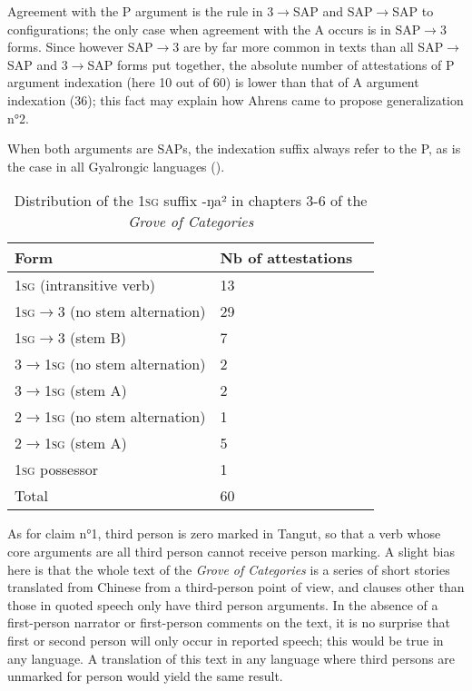 \documentclass[oldfontcommands,oneside,a4paper,11pt]{article}
\newcommand{\ipa}[1]{{\phon \mbox{#1}}} %
\begin{document}
Agreement with the P argument is the rule in 3$\rightarrow$SAP and SAP$\rightarrow$SAP to configurations; the only case when agreement with the A occurs is in SAP$\rightarrow$3 forms. Since however SAP$\rightarrow$3 are by far more common in texts than all SAP$\rightarrow$SAP and 3$\rightarrow$SAP forms put together, the absolute number of attestations of P argument indexation (here 10 out of 60) is lower than that of A argument indexation (36); this fact may explain how Ahrens came to propose generalization n°2.

When both arguments are SAPs, the indexation suffix always refer to the P, as is the case in all Gyalrongic languages (\citealt{jackson03caodeng, jacques10inverse, gongxun14agreement, lai15person}). 

\begin{table}[H]
\caption{Distribution of the \textsc{1sg} suffix \ipa{-ŋa²} in chapters 3-6 of the \textit{Grove of Categories}} \label{tab:1sg} \centering
\begin{tabular}{lll}
\toprule
Form& Nb of attestations \\
\midrule
\textsc{1sg} (intransitive verb) & 	13 \\ 
\textsc{1sg}$\rightarrow$3  (no stem alternation) & 	29 \\ 
\textsc{1sg}$\rightarrow$3 (stem B)& 	7 \\ 
3$\rightarrow$\textsc{1sg} (no stem alternation) & 	2 \\ 
3$\rightarrow$\textsc{1sg} (stem A)& 	2 \\ 
2$\rightarrow$\textsc{1sg} (no stem alternation)& 	1 \\ 
2$\rightarrow$\textsc{1sg}  (stem A)& 	5 \\ 
\textsc{1sg} possessor & 	1 \\ 
\midrule
Total & 	60 \\ 
\bottomrule
\end{tabular}
\end{table}


As for claim n°1, third person is zero marked in Tangut, so that a verb whose core arguments are all third person cannot receive person marking. A slight bias here is that the whole text of the \textit{Grove of Categories} is a series of short stories translated from Chinese from a third-person point of view, and clauses other than those in quoted speech only have third person arguments. In the absence of a first-person narrator or first-person comments on the text, it is no surprise that first or second person will only occur in reported speech; this would be true in any language.  A translation of this text in any language where third persons are unmarked for person would yield the same result.
\end{document}
